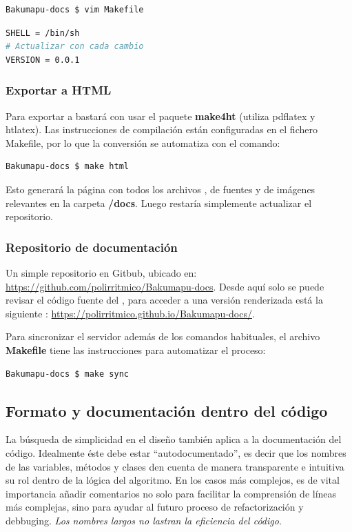 \begin{lstlisting}
Bakumapu-docs $ vim Makefile
\end{lstlisting}
\begin{lstlisting}[language=bash]
SHELL = /bin/sh
# Actualizar con cada cambio
VERSION = 0.0.1
\end{lstlisting}

\subsubsection{Exportar a HTML}\label{flujo:exportar-a-html}
Para exportar a  bastará con usar el paquete \textbf{make4ht} (utiliza pdflatex y htlatex). Las instrucciones de compilación están configuradas en el fichero Makefile, por lo que la conversión se automatiza con el comando:
\begin{lstlisting}
Bakumapu-docs $ make html
\end{lstlisting}
Esto generará la página  con todos los archivos , de fuentes y de imágenes relevantes en la carpeta \textbf{/docs}. Luego restaría simplemente actualizar el repositorio.

\subsubsection{Repositorio de documentación}\label{flujo:repositorio-de-documentacion}
Un simple repositorio  en Gitbub, ubicado en: \url{https://github.com/polirritmico/Bakumapu-docs}. Desde aquí solo se puede revisar el código fuente del , para acceder a una versión renderizada está la siguiente : \url{https://polirritmico.github.io/Bakumapu-docs/}.

Para sincronizar el servidor además de los comandos  habituales, el archivo \textbf{Makefile} tiene las instrucciones para automatizar el proceso:
\begin{lstlisting}
Bakumapu-docs $ make sync
\end{lstlisting}


\subsection{Formato y documentación dentro del código}\label{flujo:documentacion-en-codigo}
La búsqueda de simplicidad en el diseño también aplica a la documentación del código. Idealmente éste debe estar “autodocumentado”, es decir que los nombres de las variables, métodos y clases den cuenta de manera transparente e intuitiva su rol dentro de la lógica del algoritmo. En los casos más complejos, es de vital importancia añadir comentarios no solo para facilitar la comprensión de líneas más complejas, sino para ayudar al futuro proceso de refactorización y debbuging. \emph{Los nombres largos no lastran la eficiencia del código}.

